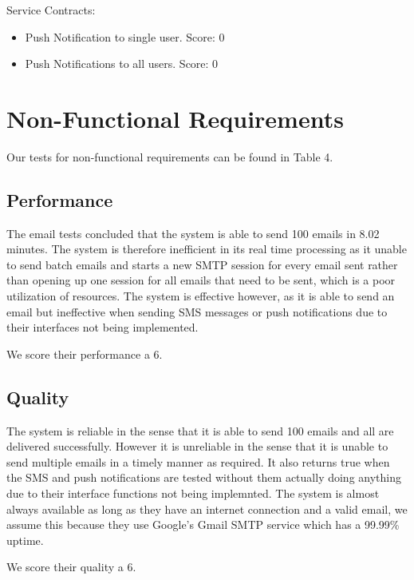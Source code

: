 \documentclass[11pt]{article}
\begin{document}
	Service Contracts:
	\begin{itemize}
      \item Push Notification to single user. Score: 0
      \item Push Notifications to all users. Score: 0
    \end{itemize}
	
	\section{Non-Functional Requirements}
	Our tests for non-functional requirements can be found in Table 4. 
	
	\subsection{Performance}
    The email tests concluded that the system is able to send 100 emails in 8.02 minutes.
    The system is therefore inefficient in its real time processing as it unable to send batch emails and starts a new SMTP session for every email sent rather than opening up one session for all emails that need to be sent, which is a poor utilization of resources. The system is effective however, as it is able to send an email but ineffective when sending SMS messages or push notifications due to their interfaces not being implemented.
    
    We score their performance a 6.
    
    \subsection{Quality}
    The system is reliable in the sense that it is able to send 100 emails and all are delivered successfully. However it is unreliable in the sense that it is unable to send multiple emails in a timely manner as required. It also returns true when the SMS and push notifications are tested without them actually doing anything due to their interface functions not being implemnted. The system is almost always available as long as they have an internet connection and a valid email, we assume this because they use Google's Gmail SMTP service which has a 99.99\% uptime.
    
    We score their quality a 6.
    
\end{document}
